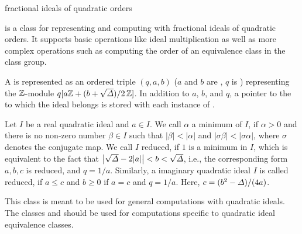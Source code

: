 

\NAME

 \dotfill fractional ideals of quadratic orders



\ABSTRACT

 is a class for representing and computing with fractional ideals of
quadratic orders.  It supports basic operations like ideal multiplication as well as more
complex operations such as computing the order of an equivalence class in the class group.


\DESCRIPTION

A  is represented as an ordered triple $(q,a,b)$ ($a$ and $b$ are
, $q$ is ) representing the $\mathbb{Z}$-module $q [a\mathbb{Z} + (b +
\sqrt{\varDelta})/ 2\, \mathbb{Z} ]$.  In addition to $a$, $b$, and $q$, a pointer to the
 to which the ideal belongs is stored with each instance of
.

Let $I$ be a real quadratic ideal and $a\in I$.  We call $\alpha$ a minimum of $I$, if $\alpha >
0$ and there is no non-zero number $\beta\in I$ such that $|\beta| < |\alpha|$ and $|\sigma
\beta| < |\sigma \alpha|$, where $\sigma$ denotes the conjugate map.  We call $I$ reduced, if
$1$ is a minimum in $I$, which is equivalent to the fact that $\bigl|\sqrt{\varDelta} - 2 |a|\bigr| < b
< \sqrt{\varDelta}$, i.e., the corresponding form $a,b,c$ is reduced, and $q = 1/a$.  Similarly, a
imaginary quadratic ideal $I$ is called reduced, if $a \leq c$ and $b \geq 0$ if $a = c$ and $q
= 1/a$.  Here, $c = (b^{2} - \varDelta)/(4a)$.

This class is meant to be used for general computations with quadratic ideals.  The classes
 and  should be used for computations specific to quadratic
ideal equivalence classes.




